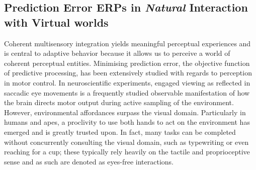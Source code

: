 \subsection{Prediction Error ERPs in \textit{Natural} Interaction with Virtual worlds}

Coherent multisensory integration yields meaningful perceptual experiences and is central to adaptive behavior because it allows us to perceive a world of coherent perceptual entities. Minimising prediction error, the objective function of predictive processing, has been extensively studied with regards to perception in motor control. In neuroscientific experiments, engaged viewing as reflected in saccadic eye movements is a frequently studied observable manifestation of how the brain directs motor output during active sampling of the environment. However, environmental affordances surpass the visual domain. Particularly in humans and apes, a proclivity to use both hands to act on the environment has emerged and is greatly trusted upon. In fact, many tasks can be completed without concurrently consulting the visual domain, such as typewriting or even reaching for a cup; these typically rely heavily on the tactile and proprioceptive sense and as such are denoted as eyes-free interactions.

